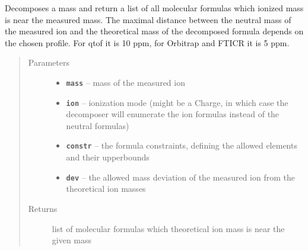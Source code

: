 \documentclass[letterpaper,10pt,openany,oneside]{sphinxmanual}
\begin{document}
\begin{fulllineitems}
\label{library:de.unijena.bioinf.sirius.decompose(double, Ionization, FormulaConstraints, Deviation)}\label{library:de.unijena.bioinf.sirius.decompose(double, Ionization, FormulaConstraints)}
Decomposes a mass and return a list of all molecular formulas which ionized mass is near the measured mass.
The maximal distance between the neutral mass of the measured ion and the theoretical mass of the decomposed formula depends on the chosen profile. For qtof it is 10 ppm, for Orbitrap and FTICR it is 5 ppm.
\begin{quote}\begin{description}
\item[{Parameters}] \leavevmode\begin{itemize}
\item {} 
\textbf{\texttt{mass}} -- mass of the measured ion

\item {} 
\textbf{\texttt{ion}} -- ionization mode (might be a Charge, in which case the decomposer will enumerate the ion formulas instead of the neutral formulas)

\item {} 
\textbf{\texttt{constr}} -- the formula constraints, defining the allowed elements and their upperbounds

\item {} 
\textbf{\texttt{dev}} -- the allowed mass deviation of the measured ion from the theoretical ion masses

\end{itemize}

\item[{Returns}] \leavevmode
list of molecular formulas which theoretical ion mass is near the given mass

\end{description}\end{quote}

\end{fulllineitems}

\end{document}
